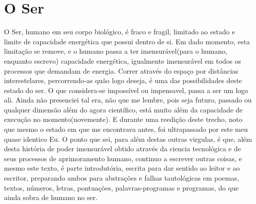 \documentclass[a4paper,11pt]{book}
\begin{document}
\section{O Ser}
O Ser, humano em seu corpo biológico, é fraco e fragil, limitado ao estado e limite de capacidade energética que possui dentro de si.
	Em dado momento, esta limitação se remove, e o humano passa a ter imensurável(para o humano, enquanto escrevo) capacidade energética, igualmente imensurável em todos os processos que demandam de energia. Correr através do espaço por distâncias interestelares, percorrendo-as quão logo deseja, é uma das possibilidades deste estado do ser. O que considera-se impossível ou impensavel, passa a ser um logo ali. 
	Ainda não presenciei tal era, não que me lembre, pois seja futuro, passado ou qualquer dimensão além do agora científico, está muito além da capacidade de execução no momento(novemente). E durante uma reedição deste trecho, noto que mesmo o estado em que me encontrava antes, foi ultrapassado por este meu quase identico Eu.
	O ponto que sei, para além destas outras virgulas, é que, além desta história de poder imensurável obtido através da ciencia tecnológica e de seus processos de aprimoramento humano, continuo a escrever outras coisas, e mesmo este texto, é parte introdutória, escrita para dar sentido ao leitor e ao escritor, preparando ambos para abstrações e falhas tautológicas em poemas, textos, números, letras, pontuações, palavras-programas e programas, do que ainda sobra de humano no ser.
	\linebreak
\end{document}
